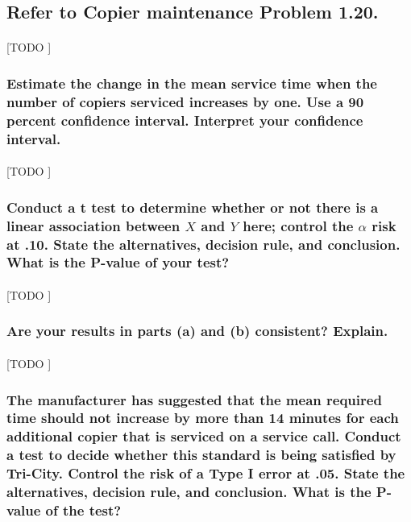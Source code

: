 \documentclass{article}
\begin{document}
    \subsection{Refer to \textbf{Copier maintenance} Problem 1.20.}

      \paragraph{}
      [TODO ]

      \subsubsection{Estimate the change in the mean service time when the number of copiers serviced increases by one. Use a 90 percent confidence interval. Interpret your confidence interval.}

        \paragraph{}
        [TODO ]

      \subsubsection{Conduct a t test to determine whether or not there is a linear association between $X$ and $Y$ here; control the $\alpha$ risk at .10. State the alternatives, decision rule, and conclusion. What is the P-value of your test?}

        \paragraph{}
        [TODO ]

      \subsubsection{Are your results in parts (a) and (b) consistent? Explain.}

        \paragraph{}
        [TODO ]

      \subsubsection{The manufacturer has suggested that the mean required time should not increase by more
than 14 minutes for each additional copier that is serviced on a service call. Conduct a test to decide whether this standard is being satisfied by Tri-City. Control the risk of a Type I error at .05. State the alternatives, decision rule, and conclusion. What is the P-value of the test?}
\end{document}
